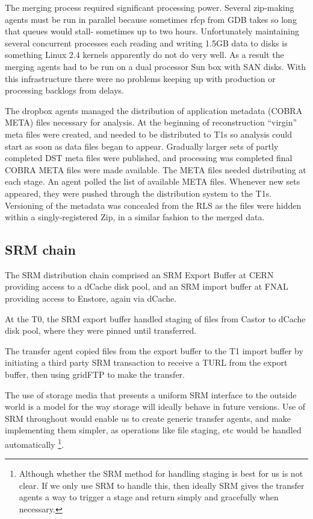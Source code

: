 \documentclass{cmspaper}
\begin{document}
The merging process required significant processing power. Several
zip-making agents must be run in parallel because sometimes rfcp from
GDB takes so long that queues would stall- sometimes up to two hours.
Unfortunately maintaining several concurrent processes each reading
and writing 1.5GB data to disks is something Linux 2.4 kernels
apparently do not do very well. As a result the merging agents had to
be run on a dual processor Sun box with SAN disks. With this
infrastructure there were no problems keeping up with production or
processing backlogs from delays.


The dropbox agents managed the distribution of application metadata
(COBRA META) files necessary for analysis. At the beginning of
reconstruction ``virgin'' meta files were created, and needed to be
distributed to T1s so analysis could start as soon as data files began
to appear.  Gradually larger sets of partly completed DST meta files
were published, and processing was completed final COBRA META files
were made available.  The META files needed distributing at each
stage. An agent polled the list of available META files.  Whenever new
sets appeared, they were pushed through the distribution system to the
T1s. Versioning of the metadata was concealed from the RLS as the
files were hidden within a singly-registered Zip, in a similar fashion
to the merged data.


\subsection{SRM chain}
The SRM distribution chain comprised an SRM Export Buffer at CERN
providing access to a dCache disk pool, and an SRM import buffer at
FNAL providing access to Enstore, again via dCache.

At the T0, the SRM export buffer handled staging of files from Castor
to dCache disk pool, where they were pinned until transferred.

The transfer agent copied files from the export buffer to the T1
import buffer by initiating a third party SRM transaction to receive a
TURL from the export buffer, then using gridFTP to make the transfer.

The use of storage media that presents a uniform SRM interface to the
outside world is a model for the way storage will ideally behave in
future versions. Use of SRM throughout would enable us to create
generic transfer agents, and make implementing them simpler, as
operations like file staging, etc would be handled automatically
\footnote{Although whether the SRM method for handling staging is best
for us is not clear. If we only use SRM to handle this, then ideally
SRM gives the transfer agents a way to trigger a stage and return
simply and gracefully when necessary.}.
\end{document}

